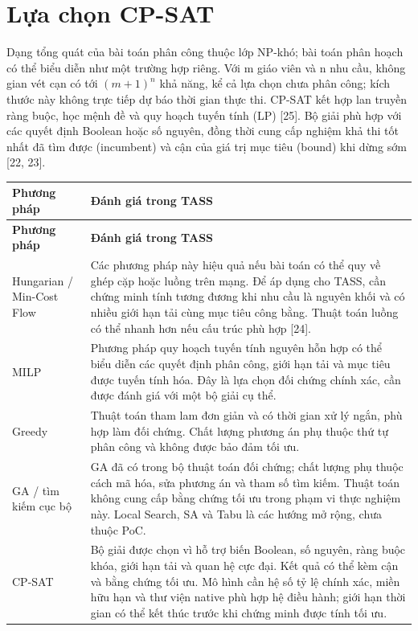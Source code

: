 \documentclass[12pt,a4paper]{report}
\begin{document}
\section{Lựa chọn CP-SAT}\label{sec:algorithm-choice}
Dạng tổng quát của bài toán phân công thuộc lớp NP-khó; bài toán phân hoạch có thể biểu diễn như một trường hợp riêng. Với m giáo viên và n nhu cầu, không gian vét cạn có tới $(m+1)^n$ khả năng, kể cả lựa chọn chưa phân công; kích thước này không trực tiếp dự báo thời gian thực thi. CP-SAT kết hợp lan truyền ràng buộc, học mệnh đề và quy hoạch tuyến tính (LP) [25]. Bộ giải phù hợp với các quyết định Boolean hoặc số nguyên, đồng thời cung cấp nghiệm khả thi tốt nhất đã tìm được (incumbent) và cận của giá trị mục tiêu (bound) khi dừng sớm [22, 23].

\begin{longtable}{|p{3.2cm}|p{10.7cm}|}
\hline
\textbf{Phương pháp} & \textbf{Đánh giá trong TASS} \\\hline
\endfirsthead
\hline
\textbf{Phương pháp} & \textbf{Đánh giá trong TASS} \\\hline
\endhead
Hungarian / Min-Cost Flow & Các phương pháp này hiệu quả nếu bài toán có thể quy về ghép cặp hoặc luồng trên mạng. Để áp dụng cho TASS, cần chứng minh tính tương đương khi nhu cầu là nguyên khối và có nhiều giới hạn tải cùng mục tiêu công bằng. Thuật toán luồng có thể nhanh hơn nếu cấu trúc phù hợp [24]. \\\hline
MILP & Phương pháp quy hoạch tuyến tính nguyên hỗn hợp có thể biểu diễn các quyết định phân công, giới hạn tải và mục tiêu được tuyến tính hóa. Đây là lựa chọn đối chứng chính xác, cần được đánh giá với một bộ giải cụ thể. \\\hline
Greedy & Thuật toán tham lam đơn giản và có thời gian xử lý ngắn, phù hợp làm đối chứng. Chất lượng phương án phụ thuộc thứ tự phân công và không được bảo đảm tối ưu. \\\hline
GA / tìm kiếm cục bộ & GA đã có trong bộ thuật toán đối chứng; chất lượng phụ thuộc cách mã hóa, sửa phương án và tham số tìm kiếm. Thuật toán không cung cấp bằng chứng tối ưu trong phạm vi thực nghiệm này. Local Search, SA và Tabu là các hướng mở rộng, chưa thuộc PoC. \\\hline
CP-SAT & Bộ giải được chọn vì hỗ trợ biến Boolean, số nguyên, ràng buộc khóa, giới hạn tải và quan hệ cực đại. Kết quả có thể kèm cận và bằng chứng tối ưu. Mô hình cần hệ số tỷ lệ chính xác, miền hữu hạn và thư viện native phù hợp hệ điều hành; giới hạn thời gian có thể kết thúc trước khi chứng minh được tính tối ưu. \\\hline
\end{longtable}
\end{document}
